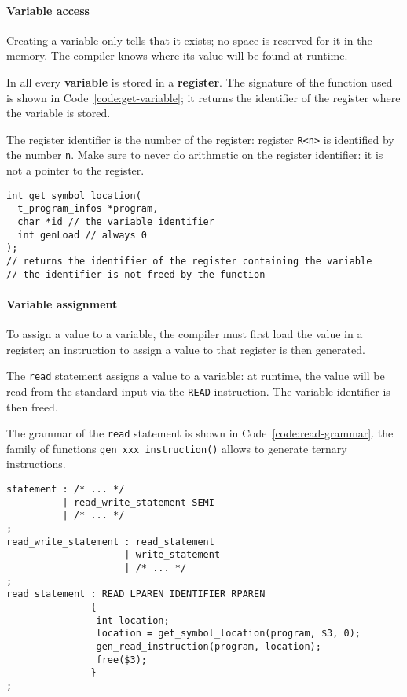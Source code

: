 \documentclass[english]{article}
\begin{document}
\paragraph{Variable access}

Creating a variable only tells \acse that it exists;
no space is reserved for it in the memory.
The compiler knows where its value will be found at runtime.

In \acse all every \textbf{variable} is stored in a \textbf{register}.
The signature of the function used is shown in Code~\ref{code:get-variable};
it returns the identifier of the register where the variable is stored.

The register identifier is the number of the register: register \texttt{R<n>} is identified by the number \texttt{n}.
Make sure to never do arithmetic on the register identifier: it is not a pointer to the register.

\begin{onepage}
  \begin{lstlisting}[language=LANCE, caption={Get variable from the list}, label={code:get-variable}]
int get_symbol_location(
  t_program_infos *program,
  char *id // the variable identifier
  int genLoad // always 0
);
// returns the identifier of the register containing the variable
// the identifier is not freed by the function
\end{lstlisting}
\end{onepage}

\paragraph{Variable assignment}

To assign a value to a variable, the compiler must first load the value in a register;
an instruction to assign a value to that register is then generated.

The \texttt{read} statement assigns a value to a variable:
at runtime, the value will be read from the standard input via the \texttt{READ} instruction.
The variable identifier is then freed.

The grammar of the \texttt{read} statement is shown in Code~\ref{code:read-grammar}.
the family of functions \texttt{gen\_xxx\_instruction()} allows to generate ternary instructions.

\begin{onepage}
  \begin{lstlisting}[language=LANCE, caption={Read grammar}, label={code:read-grammar}]
statement : /* ... */
          | read_write_statement SEMI
          | /* ... */
;
read_write_statement : read_statement
                     | write_statement
                     | /* ... */
;
read_statement : READ LPAREN IDENTIFIER RPAREN
               {
                int location;
                location = get_symbol_location(program, $3, 0);
                gen_read_instruction(program, location);
                free($3);
               }
;
\end{lstlisting}
\end{onepage}
\end{document}
